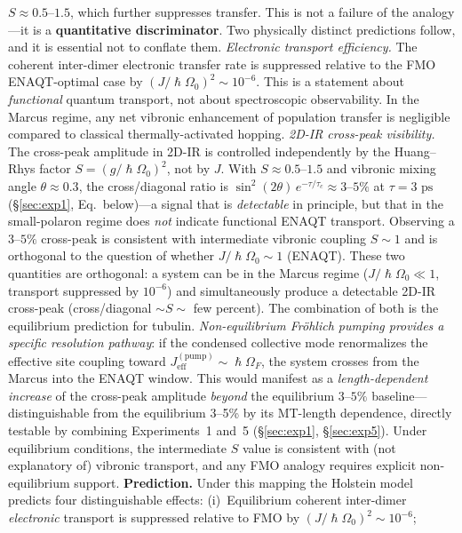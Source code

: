 \documentclass[twocolumn,10pt]{article}
\renewcommand{\hbar}{\hslash}
\newcommand{\ps}{\text{~ps}}
\begin{document}
$S \approx 0.5\text{--}1.5$, which further suppresses transfer.
This is not a failure of the analogy---it is a \textbf{quantitative discriminator}.
Two physically distinct predictions follow, and it is essential not to conflate them.
\emph{Electronic transport efficiency.} The coherent inter-dimer electronic
transfer rate is suppressed relative to the FMO ENAQT-optimal case by
$(J/\hbar\Omega_0)^2 \sim 10^{-6}$. This is a statement about
\textit{functional} quantum transport, not about spectroscopic observability.
In the Marcus regime, any net vibronic enhancement of population transfer is
negligible compared to classical thermally-activated hopping.
\emph{2D-IR cross-peak visibility.} The cross-peak amplitude in 2D-IR is
controlled independently by the Huang--Rhys factor
$S = (g/\hbar\Omega_0)^2$, not by $J$. With $S \approx 0.5$--$1.5$
and vibronic mixing angle $\theta \approx 0.3$, the cross/diagonal ratio
is $\sin^2(2\theta)\,e^{-\tau/\tau_c} \approx 3$--$5\%$ at $\tau = 3\ps$
(\S\ref{sec:exp1}, Eq.~below)---a signal that is \textit{detectable} in
principle, but that in the small-polaron regime does \textit{not} indicate
functional ENAQT transport. Observing a $3$--$5\%$ cross-peak is
consistent with intermediate vibronic coupling $S \sim 1$ and is orthogonal
to the question of whether $J/\hbar\Omega_0 \sim 1$ (ENAQT).
These two quantities are orthogonal: a system can be in the Marcus regime
($J/\hbar\Omega_0 \ll 1$, transport suppressed by $10^{-6}$) and
simultaneously produce a detectable 2D-IR cross-peak
(cross/diagonal $\sim S \sim$ few percent). The combination of both is the
equilibrium prediction for tubulin.
\emph{Non-equilibrium Fr\"ohlich pumping provides a specific resolution
pathway}: if the condensed collective mode renormalizes the effective
site coupling toward $J_{\text{eff}}^{(\text{pump})} \sim \hbar\Omega_F$,
the system crosses from the Marcus into the ENAQT window. This would
manifest as a \textit{length-dependent increase} of the cross-peak
amplitude \textit{beyond} the equilibrium $3$--$5\%$ baseline---distinguishable
from the equilibrium 3--5\% by its MT-length dependence, directly testable
by combining Experiments~1 and~5 (\S\ref{sec:exp1}, \S\ref{sec:exp5}).
Under equilibrium conditions, the intermediate $S$ value is consistent
with (not explanatory of) vibronic transport, and any FMO analogy requires
explicit non-equilibrium support.
\textbf{Prediction.} Under this mapping the Holstein model predicts four
distinguishable effects:
(i)~Equilibrium coherent inter-dimer \textit{electronic} transport is
suppressed relative to FMO by $(J/\hbar\Omega_0)^2 \sim 10^{-6}$;
\end{document}
